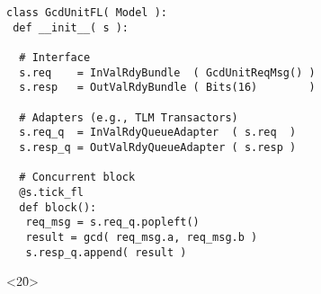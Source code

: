 \begin{frame}[fragile]

\vspace{0.3in}
\begin{lstlisting}[basicstyle={\ttfamily\footnotesize}]
class GcdUnitFL( Model ):
 def __init__( s ):

  # Interface
  s.req    = InValRdyBundle  ( GcdUnitReqMsg() )
  s.resp   = OutValRdyBundle ( Bits(16)        )

  # Adapters (e.g., TLM Transactors)
  s.req_q  = InValRdyQueueAdapter  ( s.req  )
  s.resp_q = OutValRdyQueueAdapter ( s.resp )

  # Concurrent block
  @s.tick_fl
  def block():
   req_msg = s.req_q.popleft()
   result = gcd( req_msg.a, req_msg.b )
   s.resp_q.append( result )
\end{lstlisting}

\vspace{-3.3in}\hfill
{}

\begin{onlyenv}<2\h0>
\vspace{2in}
\end{onlyenv}

\end{frame}

%
%
%
%

